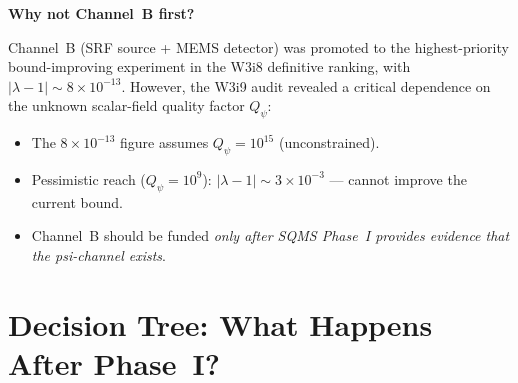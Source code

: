 \documentclass[11pt]{article}
\newcommand{\lbone}{|\lambda - 1|}
\newcommand{\Qpsi}{Q_\psi}
\newcommand{\ee}[1]{\times 10^{#1}}
\begin{document}
\textbf{Why not Channel~B first?}

Channel~B (SRF source + MEMS detector) was promoted to the
highest-priority bound-improving experiment in the W3i8 definitive
ranking, with $\lbone \sim 8\ee{-13}$. However, the W3i9 audit
revealed a critical dependence on the unknown scalar-field quality
factor $\Qpsi$:
\begin{itemize}[nosep]
\item The $8\ee{-13}$ figure assumes $\Qpsi = 10^{15}$ (unconstrained).
\item Pessimistic reach ($\Qpsi = 10^9$): $\lbone \sim 3\ee{-3}$
  --- cannot improve the current bound.
\item Channel~B should be funded \textit{only after SQMS Phase~I
  provides evidence that the psi-channel exists}.
\end{itemize}


\section{Decision Tree: What Happens After Phase~I?}
\label{sec:decision_tree}
\end{document}
